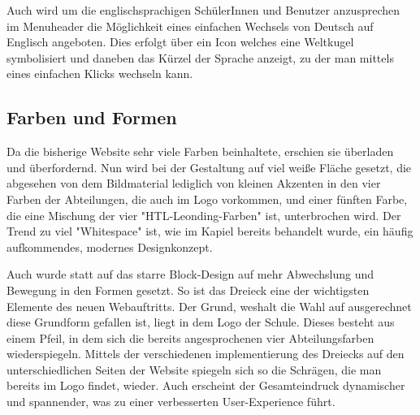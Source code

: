 Auch wird um die englischsprachigen SchülerInnen und Benutzer anzusprechen im Menuheader die Möglichkeit eines einfachen
Wechsels von Deutsch auf Englisch angeboten. Dies erfolgt über ein Icon welches eine Weltkugel symbolisiert und daneben das Kürzel der
Sprache anzeigt, zu der man mittels eines einfachen Klicks wechseln kann. 

\subsection{Farben und Formen}
Da die bisherige Website sehr viele Farben beinhaltete, erschien sie überladen und überfordernd.
Nun wird bei der Gestaltung auf viel weiße Fläche gesetzt, die abgesehen von dem Bildmaterial lediglich von kleinen Akzenten 
in den vier Farben der Abteilungen, die auch im Logo vorkommen, und einer fünften Farbe, die eine Mischung der vier 
"HTL-Leonding-Farben" ist, unterbrochen wird. Der Trend zu viel "Whitespace" ist, wie im Kapiel  bereits
behandelt wurde, ein häufig aufkommendes, modernes Designkonzept.

Auch wurde statt auf das starre Block-Design auf mehr Abwechslung und Bewegung in den Formen gesetzt.
So ist das Dreieck eine der wichtigsten Elemente des neuen Webauftritts. Der Grund, weshalt die Wahl 
auf ausgerechnet diese Grundform gefallen ist, liegt in dem Logo der Schule. Dieses besteht aus einem Pfeil,
in dem sich die bereits angesprochenen vier Abteilungsfarben wiederspiegeln. Mittels der verschiedenen
implementierung des Dreiecks auf den unterschiedlichen Seiten der Website spiegeln sich so die Schrägen,
die man bereits im Logo findet, wieder. Auch erscheint der Gesamteindruck
dynamischer und spannender, was zu einer verbesserten User-Experience führt.

